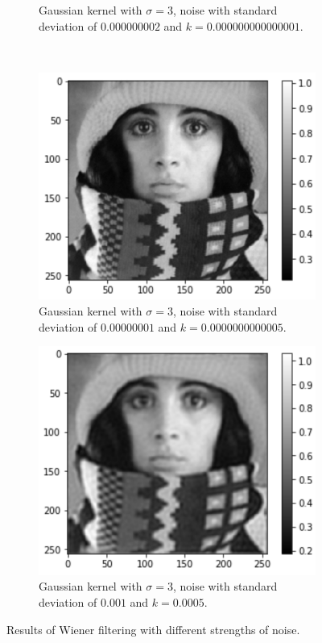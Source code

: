 \begin{figure}[H]
\begin{subfigure}[b]{0.45\linewidth}
		\caption{Gaussian kernel with $\sigma = 3$, noise with standard deviation of $0.000000002$ and $k = 0.000000000000001$.}
	\end{subfigure}
	\\
	\begin{subfigure}[b]{0.45\linewidth}
		\centering
		\includegraphics[width=\linewidth]{Materials/E5/w3}
		\caption{Gaussian kernel with $\sigma = 3$, noise with standard deviation of $0.00000001$ and $k = 0.0000000000005$.}
	\end{subfigure}
	\hfill
	\begin{subfigure}[b]{0.45\linewidth}
		\centering
		\includegraphics[width=\linewidth]{Materials/E5/w4}
		\caption{Gaussian kernel with $\sigma = 3$, noise with standard deviation of $0.001$ and $k = 0.0005$.}
	\end{subfigure}
	\caption{Results of Wiener filtering with different strengths of noise.}
	\label{wienercompare}
\end{figure}
